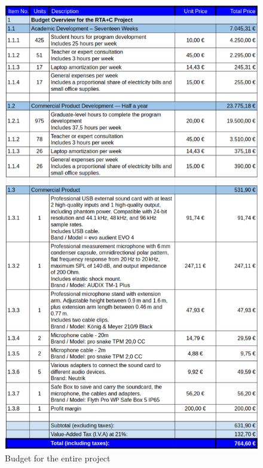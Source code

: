 \begin{figure}[H]
	\centering
	\includegraphics[width=0.82
	\linewidth]{Figures/Budget.png}
	\caption{Budget for the entire project}
	\label{fig:Budget}
\end{figure}

